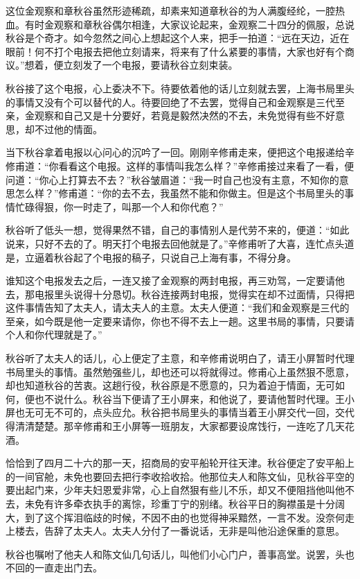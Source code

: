 \documentclass[12pt,UTF8]{ctexbook}
\begin{document}
{{{这位金观察和章秋谷虽然形迹稀疏，却素来知道章秋谷的为人满腹经纶，一腔热血。有时金观察和章秋谷偶尔相逢，大家议论起来，金观察二十四分的佩服，总说秋谷是个奇才。如今忽然之间心上想起这个人来，把手一拍道：“远在天边，近在眼前！何不打个电报去把他立刻请来，将来有了什么紧要的事情，大家也好有个商议。”想着，便立刻发了一个电报，要请秋谷立刻束装。

秋谷接了这个电报，心上委决不下。待要依着他的话儿立刻就去罢，上海书局里头的事情又没有个可以替代的人。待要回绝了不去罢，觉得自己和金观察是三代至亲，金观察和自己又是十分要好，若竟是毅然决然的不去，未免觉得有些不好意思，却不过他的情面。

当下秋谷拿着电报以心问心的沉吟了一回。刚刚辛修甫走来，便把这个电报递给辛修甫道：“你看看这个电报。这样的事情叫我怎么样？”辛修甫接过来看了一看，便问道：“你心上打算去不去？”秋谷皱眉道：“我一时自己也没有主意，不知你的意思怎么样？”修甫道：“你的去不去，我虽然不能和你做主。但是这个书局里头的事情忙碌得狠，你一时走了，叫那一个人和你代庖？”

秋谷听了低头一想，觉得果然不错，自己的事情别人是代劳不来的，便道：“如此说来，只好不去的了。明天打个电报去回他就是了。”辛修甫听了大喜，连忙点头道是，立逼着秋谷起了个电报的稿子，只说自己上海有事，不得分身。

谁知这个电报发去之后，一连又接了金观察的两封电报，再三劝驾，一定要请他去，那电报里头说得十分恳切。秋谷连接两封电报，觉得实在却不过面情，只得把这件事情告知了太夫人，请太夫人的主意。太夫人便道：“我们和金观察是三代的至亲，如今既是他一定要来请你，你也不得不去上一趟。这里书局的事情，只要请个人和你代理就是了。”

秋谷听了太夫人的话儿，心上便定了主意，和辛修甫说明白了，请王小屏暂时代理书局里头的事情。虽然勉强些儿，却也还可以将就得过。修甫心上虽然狠不愿意，却也知道秋谷的苦衷。这趟行役，秋谷原是不愿意的，只为着迫于情面，无可如何，便也不说什么。秋谷当下便请了王小屏来，和他说了，要请他暂时代理。王小屏也无可无不可的，点头应允。秋谷把书局里头的事情当着王小屏交代一回，交代得清清楚楚。那辛修甫和王小屏等一班朋友，大家都要设席饯行，一连吃了几天花酒。

恰恰到了四月二十六的那一天，招商局的安平船轮开往天津。秋谷便定了安平船上的一间官舱，未免也要回去把行李收拾收拾。他那位夫人和陈文仙，见秋谷平空的要出起门来，少年夫妇恩爱非常，心上自然狠有些儿不乐，却又不便阻挡他叫他不去，未免有许多牵衣执手的离悰，珍重丁宁的别绪。秋谷平日的胸襟虽是十分阔大，到了这个挥泪临歧的时候，不因不由的也觉得神采黯然，一言不发。没奈何走上楼去，告辞了太夫人。太夫人分付了一番说话，无非是叫他沿途保重的意思。

秋谷也嘱咐了他夫人和陈文仙几句话儿，叫他们小心门户，善事高堂。说罢，头也不回的一直走出门去。

}}}
\end{document}

